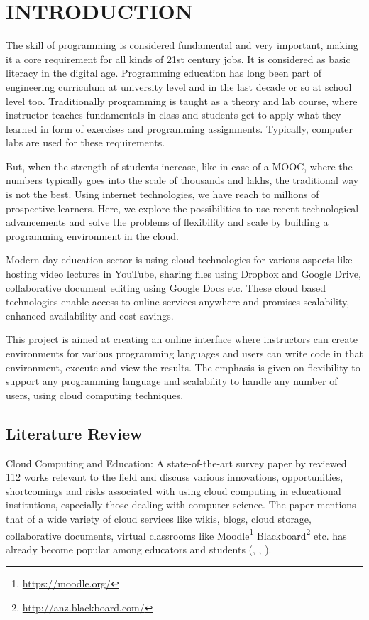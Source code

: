 \documentclass[DD]{iitmdiss}
\begin{document}
\chapter{INTRODUCTION}
\label{chap:intro}
The skill of programming is considered fundamental and very important, making it a core requirement for all kinds of 21st century jobs. It is considered as basic literacy in the digital age. Programming education has long been part of engineering curriculum at university level and in the last decade or so at school level too. Traditionally programming is taught as a theory and lab course, where instructor teaches fundamentals in class and students get to apply what they learned in form of exercises and programming assignments. Typically, computer labs are used for these requirements.  

But, when the strength of students increase, like in case of a MOOC, where the numbers typically goes into the scale of thousands and lakhs, the traditional way is not the best. Using internet technologies, we have reach to millions of prospective learners. Here, we explore the possibilities to use recent technological advancements and solve the problems of flexibility and scale by building a programming environment in the cloud.

Modern day education sector is using cloud technologies for various aspects like hosting video lectures in YouTube, sharing files using Dropbox and Google Drive, collaborative document editing using Google Docs etc. These cloud based technologies enable access to online services anywhere and promises scalability, enhanced availability and cost savings.

This project is aimed at creating an online interface where instructors can create environments for various programming languages and users can write code in that environment, execute and view the results. The emphasis is given on flexibility to support any programming language and scalability to handle any number of users, using cloud computing techniques.
\section{Literature Review}
Cloud Computing and Education: A state-of-the-art survey paper by \cite{gonzalez-martinez_cloud_2015} reviewed 112 works relevant to the field and discuss various innovations, opportunities, shortcomings and risks associated with using cloud computing in educational institutions, especially those dealing with computer science. The paper mentions that of a wide variety of cloud services like wikis, blogs, cloud storage, collaborative documents, virtual classrooms like Moodle\footnote{\url{https://moodle.org/}} Blackboard\footnote{\url{http://anz.blackboard.com/}} etc. has already become popular among educators and students (\cite{dmitriev_cloud_2012}, \cite{tan_cloud_2011}, \cite{wood_collaborative_2011}).
\end{document}

